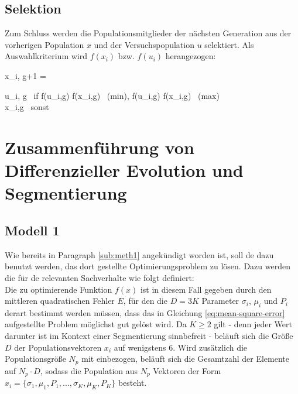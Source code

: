 		\subsection{Selektion}
		\label{sub:de-selection}
			Zum Schluss werden die Populationsmitglieder der nächsten Generation aus der vorherigen Population $x$ und der Versuchspopulation $u$ selektiert. Als Auswahlkriterium wird $f(x_{i})$ bzw. $f(u_{i})$ herangezogen:
			\begin{flalign}
				x_{i, g+1} = 
				\begin{cases}
					u_{i, g} \ \textrm{if } f(u_{i,g}) \leq f(x_{i,g}) \ \textrm{(min), } \quad f(u_{i,g}) \geq f(x_{i,g}) \ \textrm{(max)} \\
					x_{i,g} \ \textrm{sonst}
				\end{cases}
			\end{flalign}
			
	\section{Zusammenführung von Differenzieller Evolution und Segmentierung}
	\label{sec:diff-seg-together}
		
		\subsection{Modell 1}
		\label{sub:model1}
			Wie bereits in Paragraph \ref{sub:meth1} angekündigt worden ist, soll \gls{de} dazu benutzt werden, das dort gestellte Optimierungsproblem zu lösen. Dazu werden die für \gls{de} relevanten Sachverhalte wie folgt definiert:\\
			Die zu optimierende Funktion $f(x)$ ist in diesem Fall gegeben durch den mittleren quadratischen Fehler $E$, für den die $D = 3K$ Parameter $\sigma_{i}$, $\mu_{i}$ und $P_{i}$ derart bestimmt werden müssen, dass das in Gleichung \ref{eq:mean-square-error} aufgestellte Problem möglichst gut gelöst wird. Da $K \geq 2$ gilt - denn jeder Wert darunter ist im Kontext einer Segmentierung sinnbefreit - beläuft sich die Größe $D$ der Populationsvektoren $x_{i}$ auf wenigstens 6. Wird zusätzlich die Populationsgröße $N_{p}$ mit einbezogen, beläuft sich die Gesamtzahl der Elemente auf $N_{p} \cdot D$, sodass die Population aus $N_{p}$ Vektoren der Form $x_{i} = \{\sigma_{1}, \mu_{1}, P_{1}, ..., \sigma_{K}, \mu_{K}, P_{K}\}$ besteht.
			
